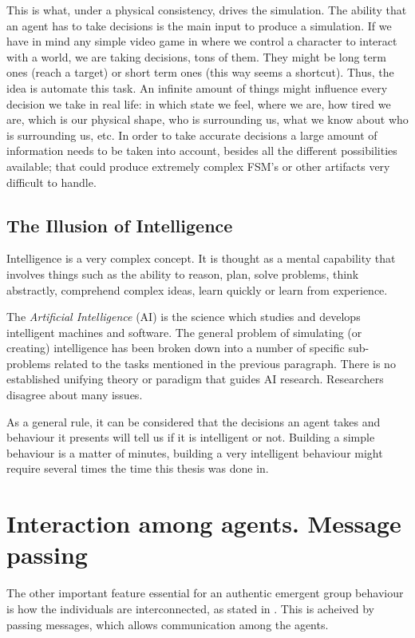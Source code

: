 This is what, under a physical consistency, drives the simulation. The ability that an agent has to take decisions is the main input to produce a simulation. If we have in mind any simple video game in where we control a character to interact with a world, we are taking decisions, tons of them. They might be long term ones (reach a target) or short term ones (this way seems a shortcut). Thus, the idea is automate this task. An infinite amount of things might influence every decision we take in real life: in which state we feel, where we are, how tired we are, which is our physical shape, who is surrounding us, what we know about who is surrounding us, etc. In order to take accurate decisions a large amount of information needs to be taken into account, besides all the different possibilities available; that could produce extremely complex FSM's or other artifacts very difficult to handle.

\subsection{The Illusion of Intelligence}

Intelligence is a very complex concept. It is thought as a mental capability that involves things such as the ability to reason, plan, solve problems, think abstractly, comprehend complex ideas, learn quickly or learn from experience.

The \emph{Artificial Intelligence} (AI) is the science which studies and develops intelligent machines and software. The general problem of simulating (or creating) intelligence has been broken down into a number of specific sub-problems related to the tasks mentioned in the previous paragraph. There is no established unifying theory or paradigm that guides AI research. Researchers disagree about many issues.

As a general rule, it can be considered that the decisions an agent takes and behaviour it presents will tell us if it is intelligent or not. Building a simple behaviour is a matter of minutes, building a very intelligent behaviour might require several times the time this thesis was done in.


\section{Interaction among agents. Message passing}

The other important feature essential for an authentic emergent group behaviour is how the individuals are interconnected, as stated in \citep{kleinrock}. This is acheived by passing messages, which allows communication among the agents.

